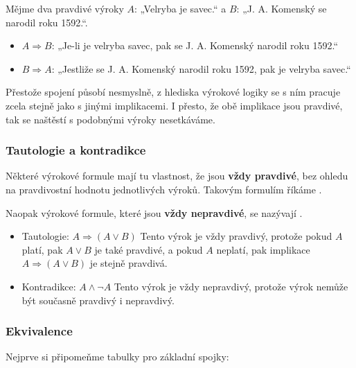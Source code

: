 \documentclass[12pt,a4paper]{article}
\begin{document}
\begin{examplebox}
       Mějme dva pravdivé výroky $A$: „Velryba je savec.“ a $B$: „J. A. Komenský se narodil roku 1592.“.


    \begin{itemize}
        \item $A \Rightarrow B$: „Je-li je velryba savec, pak se J. A. Komenský narodil roku 1592.“  
        \item $B \Rightarrow A$: „Jestliže se J. A. Komenský narodil roku 1592, pak je velryba savec.“
    \end{itemize}

    Přestože spojení působí nesmyslně, z hlediska výrokové logiky se s ním pracuje zcela stejně jako s jinými implikacemi.
    I přesto, že obě implikace jsou pravdivé, tak se naštěstí s podobnými výroky nesetkáváme.
\end{examplebox}

\subsubsection*{Tautologie a kontradikce}

Některé výrokové formule mají tu vlastnost, že jsou \textbf{vždy pravdivé}, bez ohledu na pravdivostní hodnotu jednotlivých výroků.  
Takovým formulím říkáme .  

Naopak výrokové formule, které jsou \textbf{vždy nepravdivé}, se nazývají .  

\begin{examplebox}
\begin{itemize}
    \item Tautologie: $A \Rightarrow (A \lor B)$  
          Tento výrok je vždy pravdivý, protože pokud $A$ platí, pak $A \lor B$ je také pravdivé,  
          a pokud $A$ neplatí, pak implikace $A \Rightarrow (A \lor B)$ je stejně pravdivá.  

    \item Kontradikce: $A \land \neg A$  
          Tento výrok je vždy nepravdivý, protože výrok nemůže být současně pravdivý i nepravdivý.
\end{itemize}
\end{examplebox}


\subsubsection*{Ekvivalence}
Nejprve si připomeňme tabulky pro základní spojky:
\end{document}
